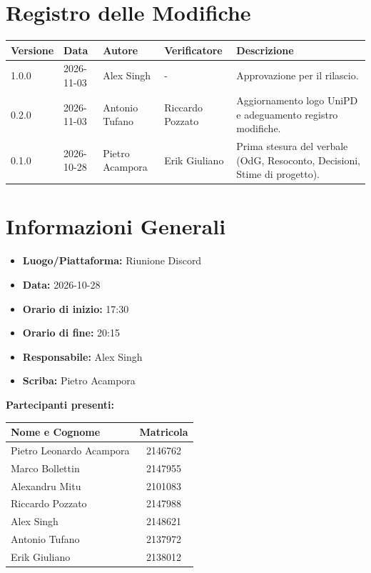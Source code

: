\documentclass[a4paper, 11pt]{article}
\begin{document}
\section*{Registro delle Modifiche}
\vspace{0.5cm}
\begin{center}
\renewcommand{\arraystretch}{1.5}
\begin{tabularx}{\textwidth}{|l|l|>{\raggedright\arraybackslash}p{3.5cm}|>{\raggedright\arraybackslash}p{3.5cm}|X|}
\hline
\textbf{Versione} & \textbf{Data} & \textbf{Autore} & \textbf{Verificatore} & \textbf{Descrizione} \\ \hline
1.0.0 & 2026-11-03 & Alex Singh & - & Approvazione per il rilascio. \\ \hline
0.2.0 & 2026-11-03 & Antonio Tufano & Riccardo Pozzato & Aggiornamento logo UniPD e adeguamento registro modifiche. \\ \hline
0.1.0 & 2026-10-28 & Pietro Acampora & Erik Giuliano & Prima stesura del verbale (OdG, Resoconto, Decisioni, Stime di progetto). \\ \hline
\end{tabularx}
\end{center}

\newpage
\tableofcontents
\newpage

\section{Informazioni Generali}
\begin{itemize}
    \item \textbf{Luogo/Piattaforma:} Riunione Discord
    \item \textbf{Data:} 2026-10-28
    \item \textbf{Orario di inizio:} 17:30
    \item \textbf{Orario di fine:} 20:15
    \item \textbf{Responsabile:} Alex Singh
    \item \textbf{Scriba:} Pietro Acampora
\end{itemize}

\vspace{0.5cm}
\textbf{Partecipanti presenti:} \\
\vspace{0.2cm}
\renewcommand{\arraystretch}{1.2}
\begin{tabular}{|l|c|}
\hline
\textbf{Nome e Cognome} & \textbf{Matricola} \\ \hline
Pietro Leonardo Acampora & 2146762 \\ \hline
Marco Bollettin & 2147955 \\ \hline
Alexandru Mitu & 2101083 \\ \hline
Riccardo Pozzato & 2147988 \\ \hline
Alex Singh & 2148621 \\ \hline
Antonio Tufano & 2137972 \\ \hline
Erik Giuliano & 2138012 \\ \hline
\end{tabular}
\end{document}
